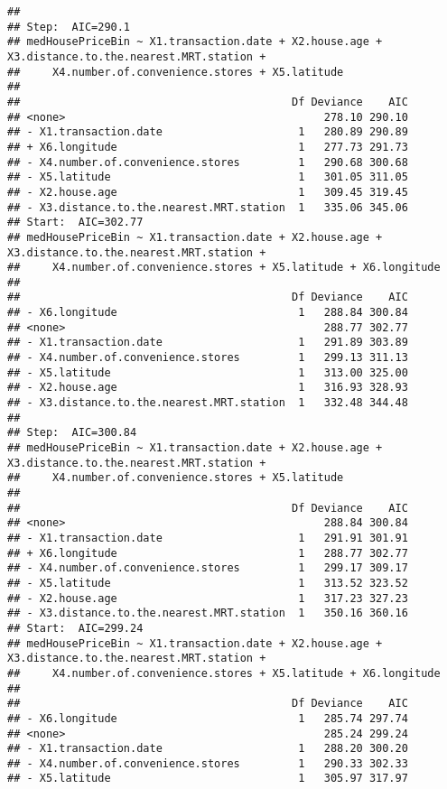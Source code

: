 \documentclass[
]{article}
\begin{document}
\begin{verbatim}
## 
## Step:  AIC=290.1
## medHousePriceBin ~ X1.transaction.date + X2.house.age + X3.distance.to.the.nearest.MRT.station + 
##     X4.number.of.convenience.stores + X5.latitude
## 
##                                          Df Deviance    AIC
## <none>                                        278.10 290.10
## - X1.transaction.date                     1   280.89 290.89
## + X6.longitude                            1   277.73 291.73
## - X4.number.of.convenience.stores         1   290.68 300.68
## - X5.latitude                             1   301.05 311.05
## - X2.house.age                            1   309.45 319.45
## - X3.distance.to.the.nearest.MRT.station  1   335.06 345.06
## Start:  AIC=302.77
## medHousePriceBin ~ X1.transaction.date + X2.house.age + X3.distance.to.the.nearest.MRT.station + 
##     X4.number.of.convenience.stores + X5.latitude + X6.longitude
## 
##                                          Df Deviance    AIC
## - X6.longitude                            1   288.84 300.84
## <none>                                        288.77 302.77
## - X1.transaction.date                     1   291.89 303.89
## - X4.number.of.convenience.stores         1   299.13 311.13
## - X5.latitude                             1   313.00 325.00
## - X2.house.age                            1   316.93 328.93
## - X3.distance.to.the.nearest.MRT.station  1   332.48 344.48
## 
## Step:  AIC=300.84
## medHousePriceBin ~ X1.transaction.date + X2.house.age + X3.distance.to.the.nearest.MRT.station + 
##     X4.number.of.convenience.stores + X5.latitude
## 
##                                          Df Deviance    AIC
## <none>                                        288.84 300.84
## - X1.transaction.date                     1   291.91 301.91
## + X6.longitude                            1   288.77 302.77
## - X4.number.of.convenience.stores         1   299.17 309.17
## - X5.latitude                             1   313.52 323.52
## - X2.house.age                            1   317.23 327.23
## - X3.distance.to.the.nearest.MRT.station  1   350.16 360.16
## Start:  AIC=299.24
## medHousePriceBin ~ X1.transaction.date + X2.house.age + X3.distance.to.the.nearest.MRT.station + 
##     X4.number.of.convenience.stores + X5.latitude + X6.longitude
## 
##                                          Df Deviance    AIC
## - X6.longitude                            1   285.74 297.74
## <none>                                        285.24 299.24
## - X1.transaction.date                     1   288.20 300.20
## - X4.number.of.convenience.stores         1   290.33 302.33
## - X5.latitude                             1   305.97 317.97

\end{verbatim}
\end{document}
